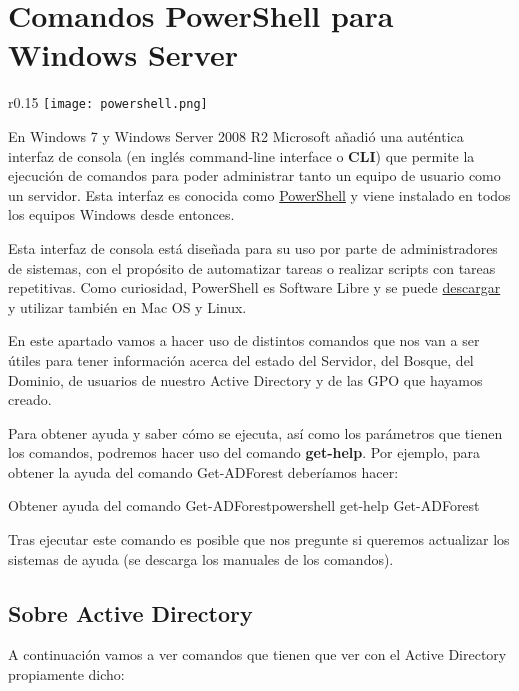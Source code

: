 \chapter{Comandos PowerShell para Windows Server}
\begin{wrapfigure}{r}{0.15\linewidth}
    \centering
    \vspace{-20pt}
    \texttt{[image: powershell.png]}
    \vspace{-40pt}
\end{wrapfigure}
En Windows 7 y Windows Server 2008 R2 Microsoft añadió una auténtica  interfaz de consola (en inglés command-line interface o \textbf{CLI}) que permite la ejecución de comandos para poder administrar tanto un equipo de usuario como un servidor. Esta interfaz es conocida como \href{https://en.wikipedia.org/wiki/PowerShell}{PowerShell} y viene instalado en todos los equipos  Windows desde entonces.

Esta interfaz de consola está diseñada para su uso por parte de administradores de sistemas, con el propósito de automatizar tareas o realizar scripts con tareas repetitivas. Como curiosidad, PowerShell es Software Libre y se puede \href{https://github.com/PowerShell/PowerShell}{descargar} y utilizar también en Mac OS y Linux.

En este apartado vamos a hacer uso de  distintos comandos que nos van a ser útiles para tener información acerca del estado del Servidor, del Bosque, del Dominio, de usuarios de nuestro Active Directory y de las GPO que hayamos creado.

Para obtener ayuda y saber cómo se ejecuta, así como los parámetros que tienen los comandos, podremos hacer uso del comando \textbf{get-help}. Por ejemplo, para obtener la ayuda del comando Get-ADForest deberíamos hacer:

\begin{mycode}{Obtener ayuda del comando Get-ADForest}{powershell}{}
get-help Get-ADForest
\end{mycode}

Tras ejecutar este comando es posible que nos pregunte si queremos actualizar los sistemas de ayuda (se descarga los manuales de los comandos).

\section{Sobre Active Directory}

A continuación  vamos a ver comandos que tienen que ver con el Active Directory propiamente dicho:

